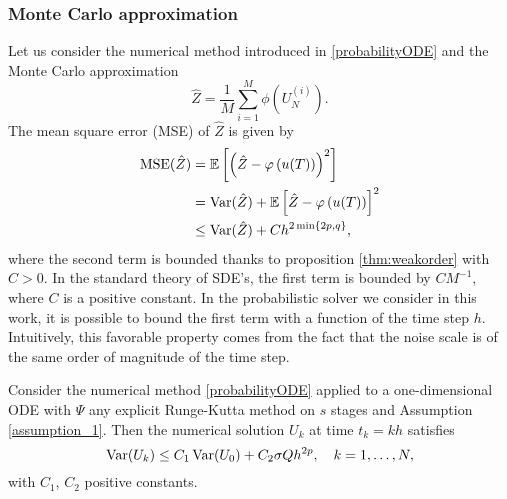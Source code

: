 \subsubsection{Monte Carlo approximation}

Let us consider the numerical method introduced in \eqref{probabilityODE} and the Monte Carlo approximation 
\begin{equation}\label{eq:MCapproximation}
\hat Z = \frac{1}{M} \sum_{i = 1}^M \phi\left(U_N^{(i)}\right).
\end{equation}
The mean square error (MSE) of $\hat Z$ is given by
\begin{equation}\label{eq:MCMSE}
\begin{aligned}
	\operatorname{MSE}(\hat Z) &= \mathbb{E}\left[\left(\hat Z - \varphi\left(u(T)\right)\right)^2\right] \\
	&= \operatorname{Var}(\hat Z) + \mathbb{E}\left[\hat Z - \varphi\left(u(T)\right)\right]^2 \\
	&\leq \operatorname{Var}(\hat Z) + C h^{2\min\{2p, q\}},
\end{aligned}
\end{equation} 
where the second term is bounded thanks to proposition \ref{thm:weakorder} with $C > 0$. In the standard theory of SDE's, the first term is bounded by $CM^{-1}$, where $C$ is a positive constant. In the probabilistic solver we consider in this work, it is possible to bound the first term with a function of the time step $h$. Intuitively, this favorable property comes from the fact that the noise scale is of the same order of magnitude of the time step. 
\begin{lemma}\label{lem:varMC} Consider the numerical method \eqref{probabilityODE} applied to a one-dimensional ODE with $\Psi$ any explicit Runge-Kutta method on $s$ stages and Assumption \ref{assumption_1}. Then the numerical solution $U_k$ at time $t_k = kh$ satisfies
\begin{equation}
	\operatorname{Var}(U_k) \leq C_1\operatorname{Var}(U_0) + C_2\sigma Q h^{2p}, \quad k = 1, \ldots, N,
\end{equation}
with $C_1$, $C_2$ positive constants.
\end{lemma}
